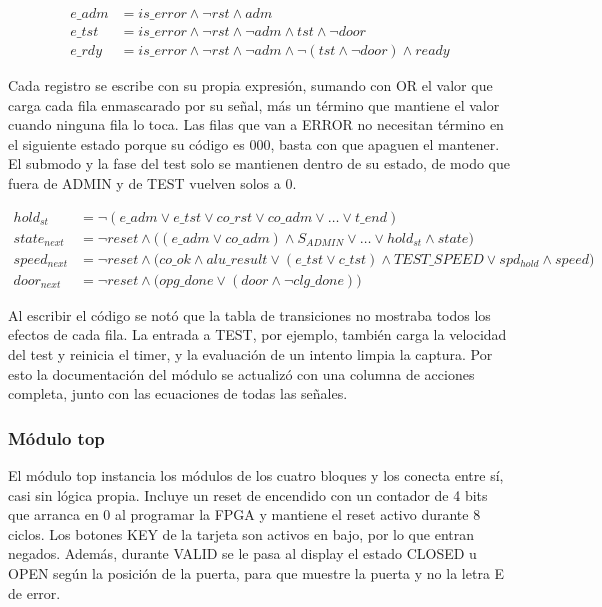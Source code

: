\documentclass[11pt,letterpaper]{article}
\begin{document}
\begin{align*}
e\_adm &= is\_error \land \lnot rst \land adm \\
e\_tst &= is\_error \land \lnot rst \land \lnot adm \land tst \land \lnot door \\
e\_rdy &= is\_error \land \lnot rst \land \lnot adm \land \lnot(tst \land \lnot door) \land ready
\end{align*}

Cada registro se escribe con su propia expresión, sumando con OR el valor que carga cada fila enmascarado por su señal, más un término que mantiene el valor cuando ninguna fila lo toca. Las filas que van a ERROR no necesitan término en el siguiente estado porque su código es 000, basta con que apaguen el mantener. El submodo y la fase del test solo se mantienen dentro de su estado, de modo que fuera de ADMIN y de TEST vuelven solos a 0.

\begin{align*}
hold_{st} &= \lnot(e\_adm \lor e\_tst \lor co\_rst \lor co\_adm \lor \ldots \lor t\_end) \\
state_{next} &= \lnot reset \land \big((e\_adm \lor co\_adm) \land S_{ADMIN} \lor \ldots \lor hold_{st} \land state\big) \\
speed_{next} &= \lnot reset \land \big(co\_ok \land alu\_result \lor (e\_tst \lor c\_tst) \land TEST\_SPEED \lor spd_{hold} \land speed\big) \\
door_{next} &= \lnot reset \land \big(opg\_done \lor (door \land \lnot clg\_done)\big)
\end{align*}

Al escribir el código se notó que la tabla de transiciones no mostraba todos los efectos de cada fila. La entrada a TEST, por ejemplo, también carga la velocidad del test y reinicia el timer, y la evaluación de un intento limpia la captura. Por esto la documentación del módulo se actualizó con una columna de acciones completa, junto con las ecuaciones de todas las señales.

\subsubsection*{Módulo top}

El módulo top instancia los módulos de los cuatro bloques y los conecta entre sí, casi sin lógica propia. Incluye un reset de encendido con un contador de 4 bits que arranca en 0 al programar la FPGA y mantiene el reset activo durante 8 ciclos. Los botones KEY de la tarjeta son activos en bajo, por lo que entran negados. Además, durante VALID se le pasa al display el estado CLOSED u OPEN según la posición de la puerta, para que muestre la puerta y no la letra E de error.
\end{document}
